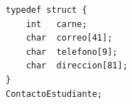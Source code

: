 \begin{lstlisting}[style=pseudocodigo]
typedef struct {
    int   carne;
    char  correo[41];
    char  telefono[9];
    char  direccion[81];
}
ContactoEstudiante;
\end{lstlisting}
